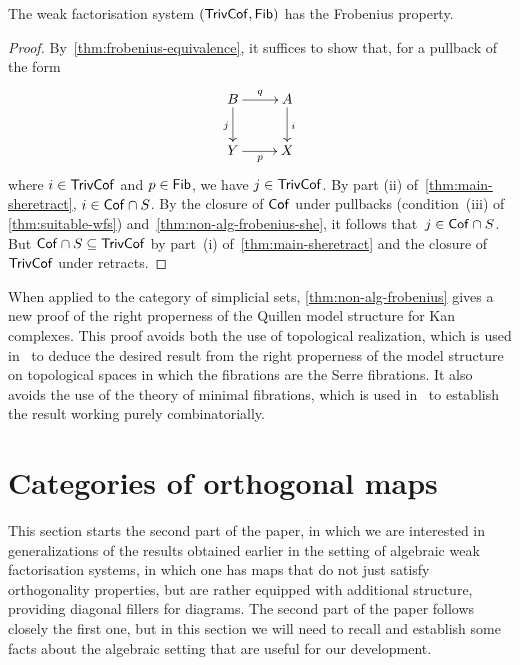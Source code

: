 \documentclass[reqno,10pt,a4paper,oneside,draft]{amsart}
\begin{document}
{{\begin{theorem} \label{thm:non-alg-frobenius}
The weak factorisation system $(\mathsf{TrivCof}, \mathsf{Fib})$ has the Frobenius property. 
\end{theorem}

\begin{proof} By~\cref{thm:frobenius-equivalence}, it suffices to show that, for a pullback of the form
\begin{equation*}
\begin{gathered}
\xymatrix{
 B \ar[d]_j \ar[r]^q & A \ar[d]^i \\ 
Y \ar[r]_p & X }
\end{gathered}
\end{equation*}
where $i  \in \mathsf{TrivCof}$ and  $p \in \mathsf{Fib}$, we have $j \in \mathsf{TrivCof}$. 
By part (ii) of~\cref{thm:main-sheretract}, $i \in \mathsf{Cof} \cap S$. By the closure of $\mathsf{Cof}$ under pullbacks (condition~(iii) of \cref{thm:suitable-wfs}) and~\cref{thm:non-alg-frobenius-she},
it follows that~$j \in \mathsf{Cof} \cap S$. But $\mathsf{Cof} \cap S \subseteq \mathsf{TrivCof}$ by part~(i) of~\cref{thm:main-sheretract} and 
the closure of $\mathsf{TrivCof}$ under retracts.
\end{proof}



When applied to the category of simplicial sets, \cref{thm:non-alg-frobenius} gives a new proof of the right properness of the Quillen model structure for Kan complexes. This proof avoids both the use of topological realization, which is used in~\cite[Theorem~13.1.13]{hirschhorn-model-localizations} to deduce the desired result from the right properness of the model structure on topological spaces in which the fibrations are the Serre fibrations. It also avoids the use of the theory of minimal fibrations, which is used in~\cite[Theorem~1.7.1]{joyal-tierney-notes} to establish the result working purely combinatorially.





\section{Categories of orthogonal maps}
\label{sec:ortf}

This section starts the second part of the paper, in which we are interested in generalizations of the results obtained earlier in the setting
of algebraic weak factorisation systems, in which one has maps that do not just satisfy orthogonality properties, but are rather equipped
with additional structure, providing diagonal fillers for diagrams. The second part of the paper follows closely the first one, but in this section
we will need to recall and establish some facts about the algebraic setting that are useful for our development. 

}}
\end{document}
